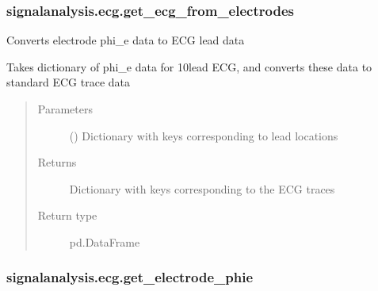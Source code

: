 \documentclass[letterpaper,10pt,english]{sphinxmanual}
\begin{document}
\subsubsection{signalanalysis.ecg.get\_ecg\_from\_electrodes}
\label{\detokenize{_autosummary/signalanalysis.ecg.get_ecg_from_electrodes:signalanalysis-ecg-get-ecg-from-electrodes}}\label{\detokenize{_autosummary/signalanalysis.ecg.get_ecg_from_electrodes::doc}}

\begin{fulllineitems}
\label{\detokenize{_autosummary/signalanalysis.ecg.get_ecg_from_electrodes:signalanalysis.ecg.get_ecg_from_electrodes}}
\sphinxAtStartPar
Converts electrode phi\_e data to ECG lead data

\sphinxAtStartPar
Takes dictionary of phi\_e data for 10\sphinxhyphen{}lead ECG, and converts these data to standard ECG trace data
\begin{quote}\begin{description}
\item[{Parameters}] \leavevmode
\sphinxAtStartPar
{} () \textendash{} Dictionary with keys corresponding to lead locations

\item[{Returns}] \leavevmode
\sphinxAtStartPar
{} \textendash{} Dictionary with keys corresponding to the ECG traces

\item[{Return type}] \leavevmode
\sphinxAtStartPar
pd.DataFrame

\end{description}\end{quote}

\end{fulllineitems}



\subsubsection{signalanalysis.ecg.get\_electrode\_phie}
\label{\detokenize{_autosummary/signalanalysis.ecg.get_electrode_phie:signalanalysis-ecg-get-electrode-phie}}\label{\detokenize{_autosummary/signalanalysis.ecg.get_electrode_phie::doc}}
\end{document}
